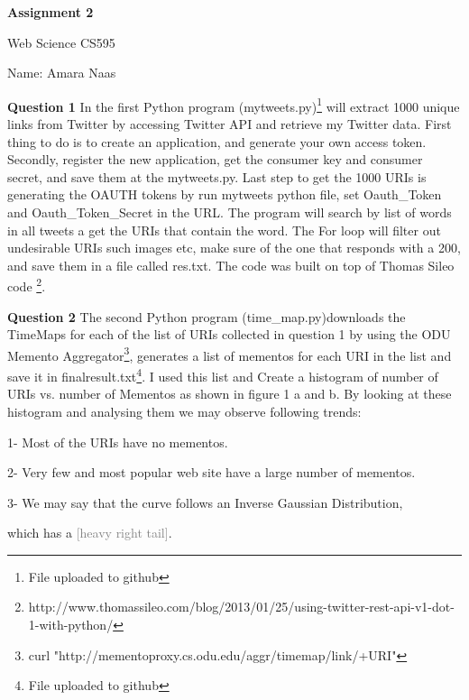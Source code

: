 \documentclass[a4paper,12pt]{article}
\begin{document}
\begin{center}
\begin{Large}


\textbf{Assignment 2}

Web Science CS595

Name: Amara Naas
\end{Large}
\end{center}
\pagebreak

\textbf{Question 1}
In the first Python program (mytweets.py)\footnote{File uploaded to github} will extract 1000 unique links from Twitter by accessing Twitter API and retrieve my Twitter data. First thing to do is to create an application, and generate your own access token. Secondly, register the new application, get the consumer key and consumer secret, and save them at the mytweets.py\footnotemark[\value{footnote}]. Last step to get the 1000 URIs is generating the OAUTH tokens by run mytweets python file, set Oauth\_Token and Oauth\_Token\_Secret in the URL.
The program will search by list of words in all tweets a get the URIs that contain the word. The For loop will filter out undesirable URIs such images etc, make sure of the one that responds with a 200, and save them in a file called res.txt\footnotemark[\value{footnote}].
The code was built on top of Thomas Sileo code \footnote{http://www.thomassileo.com/blog/2013/01/25/using-twitter-rest-api-v1-dot-1-with-python/}.
\linebreak


\textbf{Question 2}
The second Python program (time\_map.py)\footnotemark[1] downloads the TimeMaps for each of the list of URIs collected in question 1 by using the ODU Memento Aggregator\footnote{curl "http://mementoproxy.cs.odu.edu/aggr/timemap/link/+URI"}, generates a list of mementos for each URI in the list and save it in finalresult.txt\footnote{File uploaded to github}.
I used this list and Create a histogram of number of URIs vs. number of Mementos as shown in figure 1 a and b. By looking at these histogram and analysing them we may observe following trends:\par
1- Most of the URIs have no mementos.\par
2- Very few and most popular web site have a large number of mementos.\par
3- We may say that the curve follows an Inverse Gaussian Distribution,\par which has a \textcolor{gray}{[heavy right tail]}.
\end{document}

